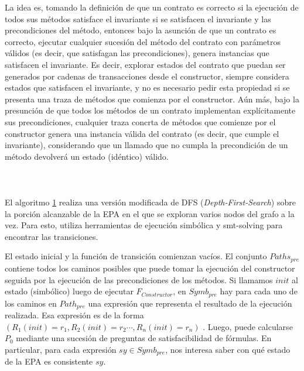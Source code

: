 La idea es, tomando la definición de que un contrato es correcto si la ejecución de todos sus métodos satisface el invariante si se satisfacen el invariante y las precondiciones del método, entonces bajo la asunción de que un contrato es correcto, ejecutar cualquier sucesión del método del contrato con parámetros válidos (es decir, que satisfagan las precondiciones), genera instancias que satisfacen el invariante.
Es decir, explorar estados del contrato que puedan ser generados por cadenas de transacciones desde el constructor, siempre considera estados que satisfacen el invariante, y no es necesario pedir esta propiedad si se presenta una traza de métodos que comienza por el constructor.
Aún más, bajo la presunción de que todos los métodos de un contrato implementan explícitamente sus precondiciones, cualquier traza concrta de métodos que comienze por el constructor genera una instancia válida del contrato (es decir, que cumple el invariante), considerando que un llamado que no cumpla la precondición de un método devolverá un estado (idéntico) válido.
\\
\\
\\

\begin{tcolorbox}[blanker,
        float=htb!,
        grow to left by=1.5cm,
        grow to right by=1.2cm,
        top=-1.2cm,
        bottom=-0.8cm,
        phantom={\phantomsection\label{epa-algoritmo}}]
    
\end{tcolorbox}

\paragraph{}
El algoritmo \hyperref[epa-algoritmo]{1} realiza una versión modificada de DFS (\textit{Depth-First-Search}) sobre la porción alcanzable de la EPA en el que se exploran varios nodos del grafo a la vez.
Para esto, utiliza herramientas de ejecución simbólica y smt-solving para encontrar las transiciones.

El estado inicial y la función de transición comienzan vacíos.
El conjunto ${Paths_{pre}}$ contiene todos los caminos posibles que puede tomar la ejecución del constructor seguida por la ejecución de las precondiciones de los métodos.
Si llamamos $init$ al estado (simbólico) luego de ejecutar $F_{Constructor}$, en $Symb_{pre}$ hay para cada uno de los caminos en $Path_{pre}$ una expresión que representa el resultado de la ejecución realizada. Esa expresión es de la forma $(R_1(init) = r_1 , R_2(init) = r_2 \cdots , R_n(init) = r_n)$ .
Luego, puede calcularse $P_0$ mediante una sucesión de preguntas de satisfacibilidad de fórmulas.
En particular, para cada expresión $sy \in Symb_{pre}$, nos interesa saber con qué estado de la EPA es consistente $sy$.

